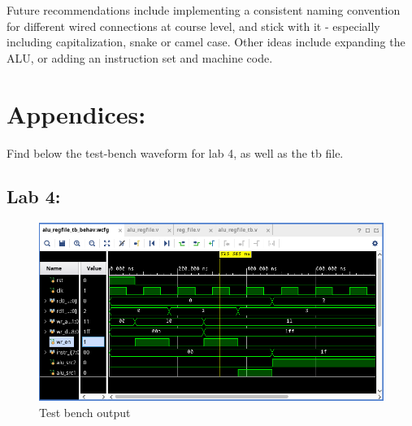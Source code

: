 \documentclass[12pt,a4paper]{article}
\begin{document}
Future recommendations include implementing a consistent naming convention for
different wired connections at course level, and stick with it - especially
including capitalization, snake or camel case. Other ideas include expanding
the ALU, or adding an instruction set and machine code. \\

\newpage
\section*{Appendices:}

Find below the test-bench waveform for lab 4, as well as the tb file. 

\subsection*{Lab 4:}

\begin{figure}[h]
	\centering
	\includegraphics[width=\linewidth]{image}
	\caption{Test bench output}
\end{figure}
\end{document}
